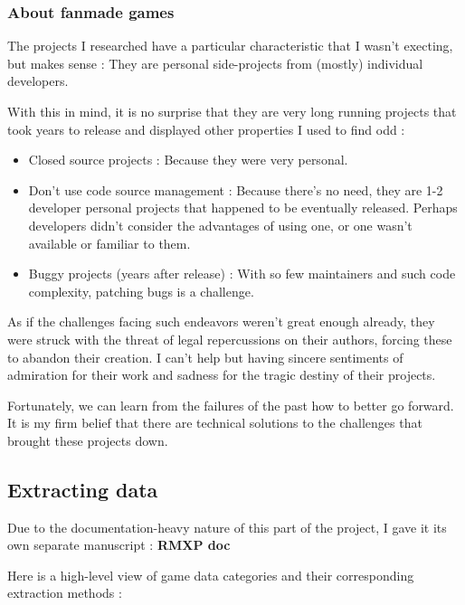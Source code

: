 \documentclass[11pt]{article}
\begin{document}
\subsubsection{About fanmade games}

The projects I researched have a particular characteristic that I wasn't execting, but makes sense : They are personal side-projects from (mostly) individual developers. 

With this in mind, it is no surprise that they are very long running projects that took years to release and displayed other properties I used to find odd :
\begin{itemize}
	\item Closed source projects : Because they were very personal.
	\item Don't use code source management : Because there's no need, they are 1-2 developer personal projects that happened to be eventually released. Perhaps developers didn't consider the advantages of using one, or one wasn't available or familiar to them.
	\item Buggy projects (years after release) : With so few maintainers and such code complexity, patching bugs is a challenge.
\end{itemize} 

As if the challenges facing such endeavors weren't great enough already, they were struck with the threat of legal repercussions on their authors, forcing these to abandon their creation. I can't help but having sincere sentiments of admiration for their work and sadness for the tragic destiny of their projects.



Fortunately, we can learn from the failures of the past how to better go forward. It is my firm belief that there are technical solutions to the challenges that brought these projects down.

\newpage
\subsection{Extracting data}

Due to the documentation-heavy nature of this part of the project, I gave it its own separate manuscript : \textbf{RMXP doc}

Here is a high-level view of game data categories and their corresponding extraction methods :
\end{document}
